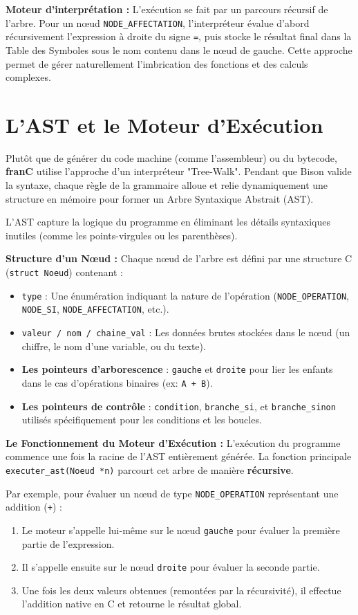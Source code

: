 \documentclass[pfe ,titlesmallcaps]{isi_report}
\begin{document}
\textbf{Moteur d'interprétation :}
L'exécution se fait par un parcours récursif de l'arbre. Pour un nœud \texttt{NODE\_AFFECTATION}, l'interpréteur évalue d'abord récursivement l'expression à droite du signe \texttt{=}, puis stocke le résultat final dans la Table des Symboles sous le nom contenu dans le nœud de gauche. Cette approche permet de gérer naturellement l'imbrication des fonctions et des calculs complexes.

\section{L'AST et le Moteur d'Exécution}

Plutôt que de générer du code machine (comme l'assembleur) ou du bytecode, \textbf{franC} utilise l'approche d'un interpréteur "Tree-Walk". Pendant que Bison valide la syntaxe, chaque règle de la grammaire alloue et relie dynamiquement une structure en mémoire pour former un Arbre Syntaxique Abstrait (AST).

L'AST capture la logique du programme en éliminant les détails syntaxiques inutiles (comme les points-virgules ou les parenthèses).

\textbf{Structure d'un Nœud :}
Chaque nœud de l'arbre est défini par une structure C (\texttt{struct Noeud}) contenant :
\begin{itemize}
	\item \texttt{type} : Une énumération indiquant la nature de l'opération (\texttt{NODE\_OPERATION}, \texttt{NODE\_SI}, \texttt{NODE\_AFFECTATION}, etc.).
	\item \texttt{valeur / nom / chaine\_val} : Les données brutes stockées dans le nœud (un chiffre, le nom d'une variable, ou du texte).
	\item \textbf{Les pointeurs d'arborescence} : \texttt{gauche} et \texttt{droite} pour lier les enfants dans le cas d'opérations binaires (ex: \texttt{A + B}).
	\item \textbf{Les pointeurs de contrôle} : \texttt{condition}, \texttt{branche\_si}, et \texttt{branche\_sinon} utilisés spécifiquement pour les conditions et les boucles.
\end{itemize}

\textbf{Le Fonctionnement du Moteur d'Exécution :}
L'exécution du programme commence une fois la racine de l'AST entièrement générée. La fonction principale \texttt{executer\_ast(Noeud *n)} parcourt cet arbre de manière \textbf{récursive}.

Par exemple, pour évaluer un nœud de type \texttt{NODE\_OPERATION} représentant une addition (\texttt{+}) :
\begin{enumerate}
	\item Le moteur s'appelle lui-même sur le nœud \texttt{gauche} pour évaluer la première partie de l'expression.
	\item Il s'appelle ensuite sur le nœud \texttt{droite} pour évaluer la seconde partie.
	\item Une fois les deux valeurs obtenues (remontées par la récursivité), il effectue l'addition native en C et retourne le résultat global.
\end{enumerate}
\end{document}
